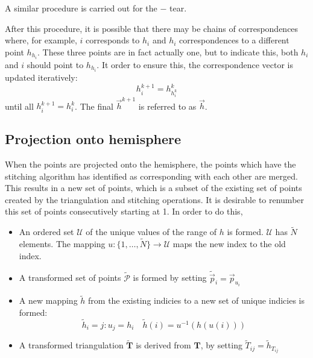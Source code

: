 \documentclass{article}
\begin{document}
A similar procedure is carried out for the $-$ tear.

After this procedure, it is possible that there may be chains of
correspondences where, for example, $i$ corresponds to $h_i$ and $h_i$
correspondences to a different point $h_{h_i}$. These three points are in
fact actually one, but to indicate this, both $h_i$ and $i$ should
point to $h_{h_i}$.  It order to ensure this, the correspondence
vector is updated iteratively:
\begin{displaymath}
  h^{k+1}_i = h^k_{h^k_i}  
\end{displaymath}
until all $h^{k+1}_i = h^k_i$. The final $\vec{h}^{k+1}$ is referred
to as $\vec{h}$.



\subsection{Projection onto hemisphere}
\label{fold-sphere:sec:proj-onto-hemisph}

When the points are projected onto the hemisphere, the points which
have the stitching algorithm has identified as corresponding with each
other are merged. This results in a new set of points, which is a
subset of the existing set of points created by the triangulation and
stitching operations. It is desirable to renumber this set of points
consecutively starting at 1. In order to do this, 
\begin{itemize}
\item An ordered set $\mathcal{U}$ of the unique values of the range
  of $h$ is formed. $\mathcal{U}$ has $\tilde N$ elements. The mapping
  $u: \{1,\dots, \tilde N\} \rightarrow \mathcal{U}$ maps the new index
  to the old index.
\item A transformed set of points $\mathcal{\tilde P}$ is formed by
  setting $\tilde{\vec{p}}_i = \vec{p}_{u_i}$
\item A new mapping $\tilde h$ from the existing indicies to a
  new set of unique indicies is formed:
  \begin{displaymath}
    \tilde h_i = j:u_j = h_i \quad
    \tilde h(i) = u^{-1}(h(u(i)))
  \end{displaymath}
\item A transformed triangulation $\tilde{\mathbf{T}}$ is derived from
  $\mathbf{T}$, by setting $\tilde{T}_{ij} = \tilde h_{T_{ij}}$
\end{itemize}
\end{document}
